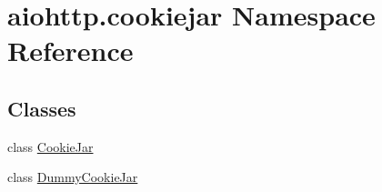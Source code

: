 \hypertarget{namespaceaiohttp_1_1cookiejar}{}\section{aiohttp.\+cookiejar Namespace Reference}
\label{namespaceaiohttp_1_1cookiejar}
\subsection*{Classes}
\begin{DoxyCompactItemize}
\item 
class \hyperlink{classaiohttp_1_1cookiejar_1_1_cookie_jar}{Cookie\+Jar}
\item 
class \hyperlink{classaiohttp_1_1cookiejar_1_1_dummy_cookie_jar}{Dummy\+Cookie\+Jar}
\end{DoxyCompactItemize}
